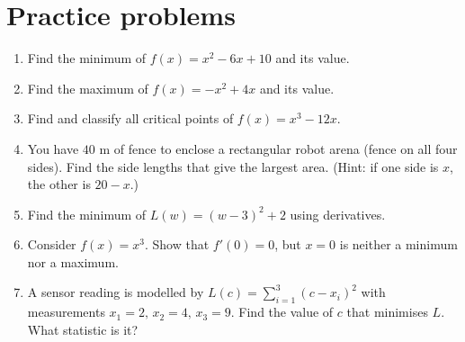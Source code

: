 \section*{Practice problems}
\begin{enumerate}[label=\textbf{\thechapter.\arabic*}]
  \item Find the minimum of $f(x)=x^2-6x+10$ and its value.
  \item Find the maximum of $f(x)=-x^2+4x$ and its value.
  \item Find and classify all critical points of $f(x)=x^3-12x$.
  \item You have $40$ m of fence to enclose a rectangular robot arena (fence on all four sides). Find the side lengths that give the largest area. (Hint: if one side is $x$, the other is $20-x$.)
  \item Find the minimum of $L(w)=(w-3)^2+2$ using derivatives.
  \item Consider $f(x)=x^3$. Show that $f'(0)=0$, but $x=0$ is neither a minimum nor a maximum.
  \item[\textbf{\thechapter.7}$\star$] A sensor reading is modelled by $L(c)=\sum_{i=1}^{3}(c-x_i)^2$ with measurements $x_1=2,\,x_2=4,\,x_3=9$. Find the value of $c$ that minimises $L$. What statistic is it?
\end{enumerate}

